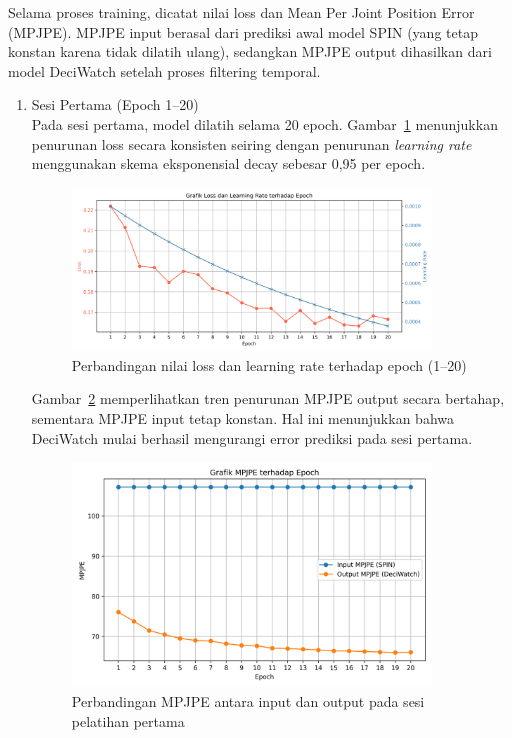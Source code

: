 Selama proses training, dicatat nilai loss dan Mean Per Joint Position Error (MPJPE). MPJPE input berasal dari prediksi awal model SPIN (yang tetap konstan karena tidak dilatih ulang), sedangkan MPJPE output dihasilkan dari model DeciWatch setelah proses filtering temporal.
\begin{enumerate}
    \item {Sesi Pertama (Epoch 1--20)} \\
    Pada sesi pertama, model dilatih selama 20 epoch. Gambar~\ref{fig:loss_lr_epoch_1} menunjukkan penurunan loss secara konsisten seiring dengan penurunan \textit{learning rate} menggunakan skema eksponensial decay sebesar 0{,}95 per epoch.

    \begin{figure}[H]
        \centering
        \includegraphics[width=0.9\textwidth]{images/loss_lr_vs_epoch.png}
        \caption{Perbandingan nilai loss dan learning rate terhadap epoch (1--20)}
        \label{fig:loss_lr_epoch_1}
    \end{figure}

    Gambar~\ref{fig:mpjpe_epoch_1} memperlihatkan tren penurunan MPJPE output secara bertahap, sementara MPJPE input tetap konstan. Hal ini menunjukkan bahwa DeciWatch mulai berhasil mengurangi error prediksi pada sesi pertama.

    \begin{figure}[H]
        \centering
        \includegraphics[width=0.9\textwidth]{images/mpjpe_vs_epoch.png}
        \caption{Perbandingan MPJPE antara input dan output pada sesi pelatihan pertama}
        \label{fig:mpjpe_epoch_1}
    \end{figure}


\end{enumerate}
